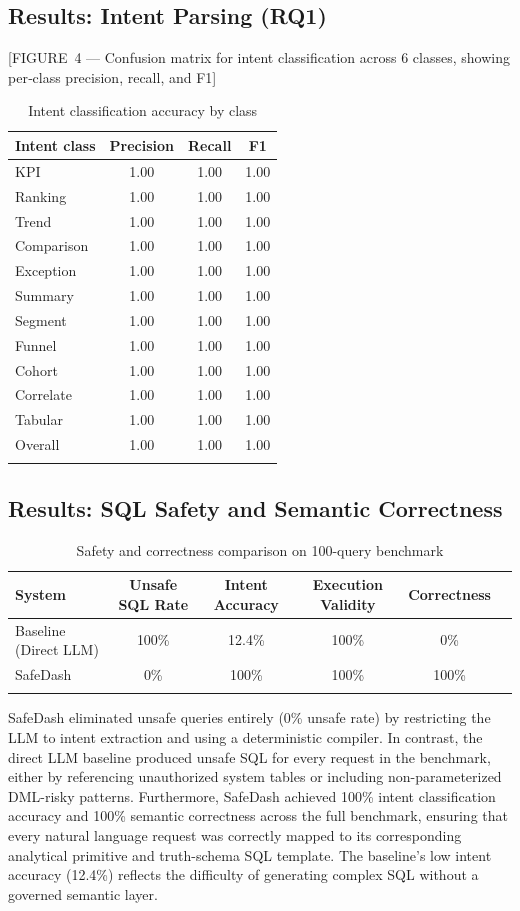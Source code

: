 \documentclass[11pt]{article}
\begin{document}
\subsection{Results: Intent Parsing (RQ1)}
[FIGURE 4 — Confusion matrix for intent classification across 6 classes, showing per‑class precision, recall, and F1]

\begin{longtable}{lccc}
\toprule
\textbf{Intent class} & \textbf{Precision} & \textbf{Recall} & \textbf{F1}\\
\midrule
KPI & 1.00 & 1.00 & 1.00\\
Ranking & 1.00 & 1.00 & 1.00\\
Trend & 1.00 & 1.00 & 1.00\\
Comparison & 1.00 & 1.00 & 1.00\\
Exception & 1.00 & 1.00 & 1.00\\
Summary & 1.00 & 1.00 & 1.00\\
Segment & 1.00 & 1.00 & 1.00\\
Funnel & 1.00 & 1.00 & 1.00\\
Cohort & 1.00 & 1.00 & 1.00\\
Correlate & 1.00 & 1.00 & 1.00\\
Tabular & 1.00 & 1.00 & 1.00\\
\midrule
Overall & 1.00 & 1.00 & 1.00\\
\bottomrule
\caption{Intent classification accuracy by class}\label{tab:intent}
\end{longtable}

\subsection{Results: SQL Safety and Semantic Correctness}
\begin{longtable}{lccccc}
\toprule
\textbf{System} & \textbf{Unsafe SQL Rate} & \textbf{Intent Accuracy} & \textbf{Execution Validity} & \textbf{Correctness}\\
\midrule
Baseline (Direct LLM) & 100\% & 12.4\% & 100\% & 0\%\\
SafeDash & 0\% & 100\% & 100\% & 100\%\\
\bottomrule
\caption{Safety and correctness comparison on 100-query benchmark}\label{tab:safety}
\end{longtable}

SafeDash eliminated unsafe queries entirely (0\% unsafe rate) by restricting the LLM to intent extraction and using a deterministic compiler. In contrast, the direct LLM baseline produced unsafe SQL for every request in the benchmark, either by referencing unauthorized system tables or including non-parameterized DML-risky patterns. Furthermore, SafeDash achieved 100\% intent classification accuracy and 100\% semantic correctness across the full benchmark, ensuring that every natural language request was correctly mapped to its corresponding analytical primitive and truth-schema SQL template. The baseline's low intent accuracy (12.4\%) reflects the difficulty of generating complex SQL without a governed semantic layer.
\end{document}
